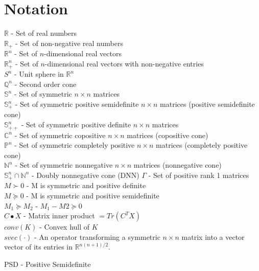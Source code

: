 \documentclass[12pt]{book}
\author{Matúš Stehlík}
\theoremstyle{definition}
\begin{document}
\section*{Notation}

$\mathbb{R}$ - Set of real numbers \\
$\mathbb{R}_+$ - Set of non-negative real numbers \\
$\mathbb{R}^n$ - Set of $n$-dimensional real vectors   \\
$\mathbb{R}^n_{+}$ -  Set of $n$-dimensional real vectors with non-negative entries  \\

$S^n$ - Unit sphere in $\mathbb{R}^n$ \\

$\mathbb{Q}^n$ - Second order cone \\

$\mathbb{S}^n$ - Set of symmetric $n\times n$ matrices \\
$\mathbb{S}^n_+$ - Set of symmetric positive semidefinite $n\times n$ matrices (positive semidefinite cone) \\
$\mathbb{S}^n_{++}$ - Set of symmetric positive definite $n\times n$ matrices \\

$\mathbb{C}^n$ - Set of symmetric copositive $n\times n$ matrices (copositive cone) \\
$\mathbb{P}^n$ - Set of symmetric completely positive $n\times n$ matrices (completely positive cone)\\
$\mathbb{N}^n$ - Set of symmetric nonnegative $n\times n$ matrices (nonnegative cone) \\
$\mathbb{S}^n_+ \cap \mathbb{N}^n$ - Doubly nonnegative cone (DNN)
$\Gamma $ - Set of positive rank 1 matrices\\


$M\succ 0$ - M is symmetric and positive definite \\
$M\succeq 0$ - M is symmetric and positive semidefinite \\
$M_1 \succeq M_2$ - $M_1 - M2\succeq 0$ \\
$C\bullet X$ - Matrix inner product $=Tr(C^TX)$ \\

$conv(K)$ - Convex hull of $K$ \\
$svec(\cdot)$ - An operator transforming a symmetric $n\times n$ matrix into a vector vector of its entries in $\mathbb{R}^{n(n+1)/2}$.


PSD - Positive Semidefinite \\
\end{document}
